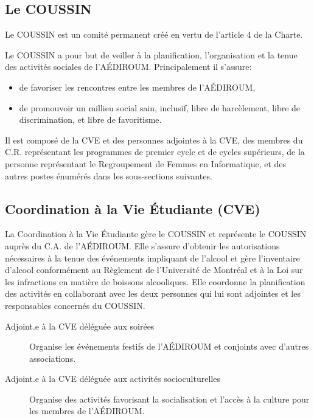 \documentclass{aediroum}
\begin{document}
\setcounter{subsection}{-1}
\subsection{Le COUSSIN}\label{sec:coussin}

Le COUSSIN est un comité permanent créé en vertu de l'article 4 de la Charte.

Le COUSSIN a pour but de veiller à la planification, l'organisation et la tenue des activités sociales de l'AÉDIROUM. Principalement il s'assure:

\begin{itemize}
    \item de favoriser les rencontres entre les membres de l'AÉDIROUM,
    \item de promouvoir un millieu social sain, inclusif, libre de harcèlement, libre de discrimination, et libre de favoritisme.
\end{itemize}

Il est composé de la CVE et des personnes adjointes à la CVE, des membres du C.R. représentant les programmes de premier cycle et de cycles supérieurs, de la personne représentant le Regroupement de Femmes en Informatique, et des autres postes énumérés dans les sous-sections suivantes.

\subsection{Coordination à la Vie Étudiante (CVE)}\label{sec:cve}

La Coordination à la Vie Étudiante gère le COUSSIN et représente le COUSSIN auprès du C.A. de l’AÉDIROUM. Elle s’assure d’obtenir les autorisations nécessaires à la tenue des événements impliquant de l’alcool et gère l’inventaire d’alcool conformément au Règlement de l’Université de Montréal et à la Loi sur les infractions en matière de boissons alcooliques. Elle coordonne la planification des activités en collaborant avec les deux personnes qui lui sont adjointes et les responsables concernés du COUSSIN.

\begin{description}
    \item[Adjoint.e à la CVE déléguée aux soirées] Organise les événements festifs de l’AÉDIROUM et conjoints avec d’autres associations.
    \item[Adjoint.e à la CVE déléguée aux activités socioculturelles] Organise des activités favorisant la socialisation et l’accès à la culture pour les membres de l’AÉDIROUM.
\end{description}
\end{document}

